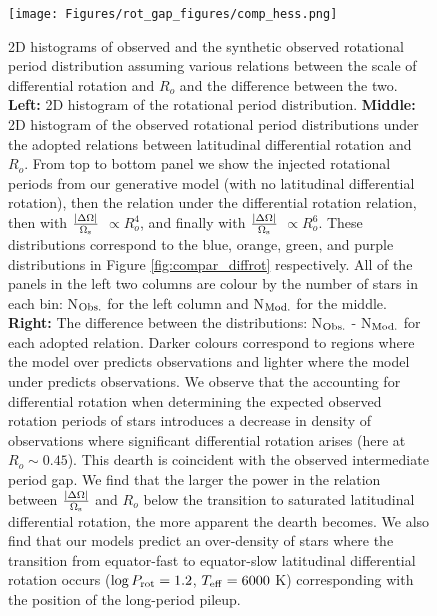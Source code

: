 \begin{figure}
\centering
  \texttt{[image: Figures/rot\_gap\_figures/comp\_hess.png]}
  \caption[2D histograms of observed and the synthetic observed rotational period distribution assuming various relations between the scale of differential rotation and $R_o$ and the difference between the two.]{
2D histograms of observed and the synthetic observed rotational period distribution assuming various relations between the scale of differential rotation and $R_o$ and the difference between the two.
\textbf{Left:} 2D histogram of the \citet{mcquillan_rotation_2014} rotational period distribution.
\textbf{Middle:} 2D histogram of the observed rotational period distributions under the adopted relations between latitudinal differential rotation and $R_o$. From top to bottom panel we show the injected rotational periods from our generative model (with no latitudinal differential rotation), then the relation under the \citet{saar_starspots_2011} differential rotation relation, then with $\frac{|\Delta\Omega|}{\Omega_{\rm{s}}}$ $\propto R_o^4$, and finally with $\frac{|\Delta\Omega|}{\Omega_{\rm{s}}}$ $\propto R_o^6$.
These distributions correspond to the blue, orange, green, and purple distributions in Figure \ref{fig:compar_diffrot} respectively.
All of the panels in the left two columns are colour by the number of stars in each bin: N$_{\rm{Obs.}}$ for the left column and N$_{\rm{Mod.}}$ for the middle.
\textbf{Right:} The difference between the distributions: N$_{\rm{Obs.}}$ - N$_{\rm{Mod.}}$ for each adopted relation.
Darker colours correspond to regions where the model over predicts observations and lighter where the model under predicts observations. We observe that the accounting for differential rotation when determining the expected observed rotation periods of stars introduces a decrease in density of observations where significant differential rotation arises (here at $R_o \sim 0.45$). This dearth is coincident with the observed intermediate period gap. We find that the larger the power in the relation between $\frac{|\Delta\Omega|}{\Omega_{\rm{s}}}$ and $R_o$ below the transition to saturated latitudinal differential rotation, the more apparent the dearth becomes. We also find that our models predict an over-density of stars where the transition from equator-fast to equator-slow latitudinal differential rotation occurs ($\log P_{\rm{rot}} =  1.2$, $T_{\rm{eff}}  =  6000$ K) corresponding with the position of the long-period pileup.}
  \label{fig:comp_hess}
\end{figure}

